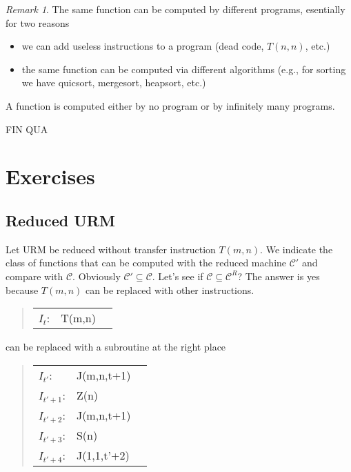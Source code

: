 \documentclass{amsbook}
\theoremstyle{definition}
\theoremstyle{remark}
\newtheorem{remark}[theorem]{Remark}
\numberwithin{section}{chapter}
\numberwithin{equation}{chapter}
\begin{document}
\begin{remark}
  The same function can be computed by different programs, esentially for two reasons

  \begin{itemize}
  \item we can add useless instructions to a program (dead code, $T(n,n)$, etc.)

  \item the same function can be computed via different algorithms
    (e.g., for sorting we have quicsort, mergesort, heapsort, etc.)
  \end{itemize}  

  A function is computed either by no program or by infinitely many programs.
\end{remark}


FIN QUA

\section {Exercises}

\subsection{Reduced URM}

Let URM be reduced without transfer instruction $T(m, n)$. We indicate the class of functions that can be computed with the reduced machine $ \mathcal{C}' $ and compare with $ \mathcal{C} $. Obviously $ \mathcal{C}' \subseteq \mathcal{C} $. Let's see if $ \mathcal{C} \subseteq \mathcal{C}^R$? The answer is yes because $T(m, n)$ can be replaced with other instructions.

\begin{quote}
  \begin{tabular}{lll}            
      $I_t$: & T(m,n) \\
  \end{tabular}
\end{quote}

can be replaced with a subroutine at the right place

\begin{quote}
  \begin{tabular}{lll}            
    $I_{t'}$:   & J(m,n,t+1)  \\
    $I_{t'+1}$: & Z(n)        \\
    $I_{t'+2}$: & J(m,n,t+1)  \\
    $I_{t'+3}$: & S(n)        \\
    $I_{t'+4}$: & J(1,1,t'+2) \\
  \end{tabular}
\end{quote}
\end{document}
